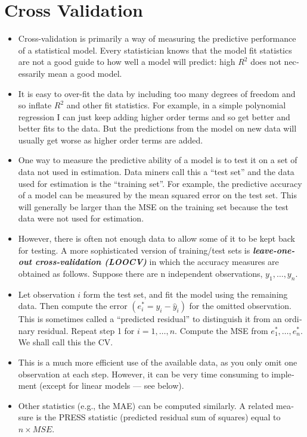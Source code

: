 \documentclass[]{report}
\begin{document}
\section*{Cross Validation}
\begin{itemize}
\item
Cross-​​validation is pri­mar­ily a way of mea­sur­ing the pre­dic­tive per­for­mance of a sta­tis­ti­cal model. Every sta­tis­ti­cian knows that the model fit sta­tis­tics are not a good guide to how well a model will pre­dict: high $R^2$ does not nec­es­sar­ily mean a good model. 
\item It is easy to over-​​fit the data by includ­ing too many degrees of free­dom and so inflate $R^2$ and other fit sta­tis­tics. For exam­ple, in a sim­ple poly­no­mial regres­sion I can just keep adding higher order terms and so get bet­ter and bet­ter fits to the data. But the pre­dic­tions from the model on new data will usu­ally get worse as higher order terms are added.
\item
One way to mea­sure the pre­dic­tive abil­ity of a model is to test it on a set of data not used in esti­ma­tion. Data min­ers call this a “test set” and the data used for esti­ma­tion is the “train­ing set”. For exam­ple, the pre­dic­tive accu­racy of a model can be mea­sured by the mean squared error on the test set. This will gen­er­ally be larger than the MSE on the train­ing set because the test data were not used for estimation.
\item
How­ever, there is often not enough data to allow some of it to be kept back for test­ing. A more sophis­ti­cated ver­sion of training/​​test sets is \textit{\textbf{leave-​​one-​​out cross-​​​​validation (LOOCV)}} in which the accu­racy mea­sures are obtained as fol­lows. Sup­pose there are n inde­pen­dent obser­va­tions, $y_1,\dots,y_n$.
\item
Let obser­va­tion $i$ form the test set, and fit the model using the remain­ing data. Then com­pute the error $(e_{i}^*=y_{i}-\hat{y}_{i})$ for the omit­ted obser­va­tion. This is some­times called a “pre­dicted resid­ual” to dis­tin­guish it from an ordi­nary residual.
Repeat step 1 for $i=1,\dots,n$.
Com­pute the MSE from $e_{1}^*,\dots,e_{n}^*$. We shall call this the CV.
\item
This is a much more effi­cient use of the avail­able data, as you only omit one obser­va­tion at each step. How­ever, it can be very time con­sum­ing to imple­ment (except for lin­ear mod­els — see below).
\item 
Other sta­tis­tics (e.g., the MAE) can be com­puted sim­i­larly. A related mea­sure is the PRESS sta­tis­tic (pre­dicted resid­ual sum of squares) equal to $n \times MSE$.
\end{itemize}
\end{document}
